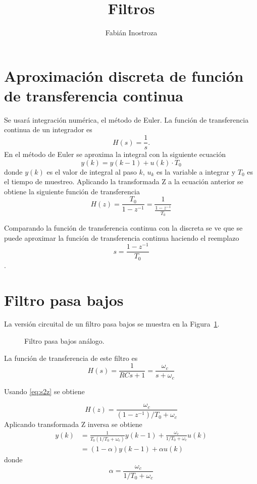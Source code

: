 \documentclass[11pt]{article} %
\title{Filtros}
\author{Fabián Inostroza}
\begin{document}
\maketitle

\section{Aproximación discreta de función de transferencia continua}
Se usará integración numérica, el método de Euler.
La función de transferencia continua de un integrador es
\[ H(s) = \frac{1}{s}. \]
En el método de Euler se aproxima la integral con la siguiente 
ecuación
\[ y(k) = y(k-1)+ u(k)\cdot T_0 \]
donde \( y(k) \) es el valor de integral al paso \( k \),
\( u_k \) es la variable a integrar y \( T_0 \) es el 
tiempo de muestreo. Aplicando la transformada Z a la ecuación 
anterior se obtiene la siguiente función de transferencia
\[ H(z) = \frac{T_0}{1-z^{-1}} = \frac{1}{ \frac{1-z^{-1}}{T_0} } \]

Comparando la función de transferencia continua con la 
discreta se ve que se puede aproximar la función de 
 transferencia continua haciendo el reemplazo 
\begin{equation}
s = \frac{1-z^{-1}}{T_0} \label{eq:s2z}
\end{equation}.
 
\section{Filtro pasa bajos}
La versión circuital de un filtro pasa bajos se muestra en la Figura~\ref{fig:LPF}.

\begin{figure}[h!tb]
\centering

\caption{Filtro pasa bajos análogo.}
\label{fig:LPF}
\end{figure}

La función de transferencia de este filtro es
\[ H(s) = \frac{1}{RCs+1} = \frac{\omega_c}{s+\omega_c} \]

Usando \eqref{eq:s2z} se obtiene

\[ H(z) = \frac{\omega_c}{(1-z^{-1})/T_0 + \omega_c} \]
Aplicando transformada Z inversa se obtiene
\begin{align*}
y(k) &= \frac{1}{T_0 (1/T_0+\omega_c)
} y(k-1) + \frac{\omega_c}{1/T_0+\omega_c} u(k)  \\
	&= (1-\alpha)y(k-1) + \alpha u(k)
\end{align*}
donde
\[ \alpha = \frac{\omega_c}{1/T_0+\omega_c} \]
\end{document}
